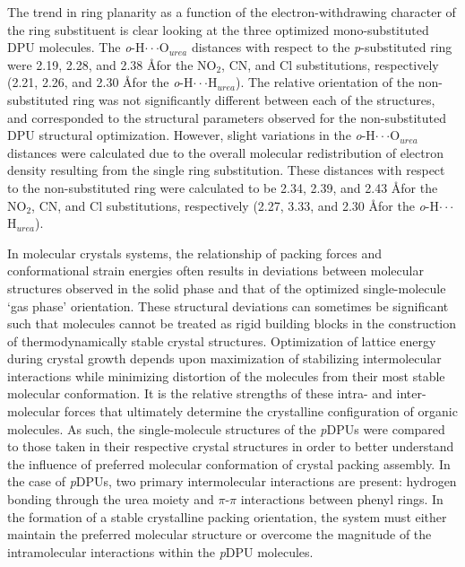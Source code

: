 The trend in ring planarity as a function of the electron-withdrawing character of the ring substituent is clear looking at the three optimized mono-substituted DPU molecules. The \textit{o}-H$\cdot \cdot \cdot$O$_{urea}$ distances with respect to the \textit{p}-substituted ring were 2.19, 2.28, and 2.38 \AA for the NO$_{2}$, CN, and Cl substitutions, respectively (2.21, 2.26, and 2.30 \AA for the \textit{o}-H$\cdot \cdot \cdot$H$_{urea}$). The relative orientation of the non-substituted ring was not significantly different between each of the structures, and corresponded to the structural parameters observed for the non-substituted DPU structural optimization. However, slight variations in the \textit{o}-H$\cdot \cdot \cdot$O$_{urea}$ distances were calculated due to the overall molecular redistribution of electron density resulting from the single ring substitution. These distances with respect to the non-substituted ring were calculated to be 2.34, 2.39, and 2.43 \AA for the NO$_{2}$, CN, and Cl substitutions, respectively (2.27, 3.33, and 2.30 \AA for the \textit{o}-H$\cdot \cdot \cdot$H$_{urea}$).

In molecular crystals systems, the relationship of packing forces and conformational strain energies often results in deviations between molecular structures observed in the solid phase and that of the optimized single-molecule `gas phase' orientation. These structural deviations can sometimes be significant such that molecules cannot be treated as rigid building blocks in the construction of thermodynamically stable crystal structures. Optimization of lattice energy during crystal growth depends upon maximization of stabilizing intermolecular interactions while minimizing distortion of the molecules from their most stable molecular conformation. It is the relative strengths of these intra- and inter-molecular forces that ultimately determine the crystalline configuration of organic molecules. As such, the single-molecule structures of the \textit{p}DPUs were compared to those taken in their respective crystal structures in order to better understand the influence of preferred molecular conformation of crystal packing assembly. In the case of \textit{p}DPUs, two primary intermolecular interactions are present: hydrogen bonding through the urea moiety and $\pi$-$\pi$ interactions between phenyl rings. In the formation of a stable crystalline packing orientation, the system must either maintain the preferred molecular structure or overcome the magnitude of the intramolecular interactions within the \textit{p}DPU molecules.

